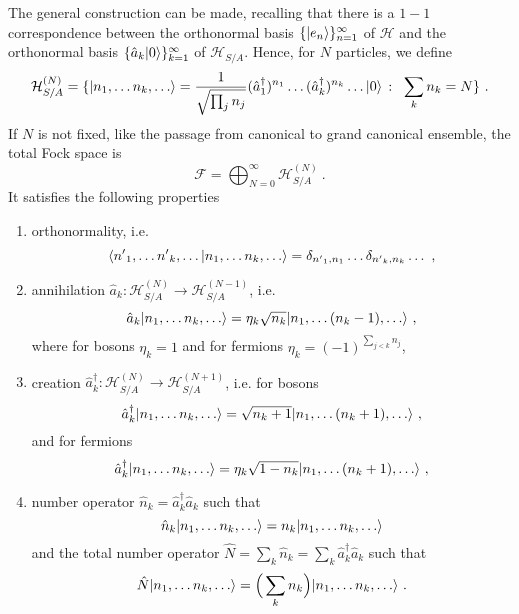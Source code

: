     The general construction can be made, recalling that there is a $1-1$ correspondence between the orthonormal basis $\{\vert e_n\rangle\}_{n=1}^\infty$ of $\mathcal H$ and the orthonormal basis $\{\hat a_k \vert0\rangle\}_{k=1}^\infty$ of $\mathcal H_{S/A}$. Hence, for $N$ particles, we define
    \begin{equation*}
        \mathcal H_{S/A}^{(N)} = \{\vert n_1, \ldots n_k, \ldots\rangle = \frac{1}{\sqrt{ \prod_j n_j}} (\hat a_1^\dagger)^{n_1} \ldots (\hat a_k^\dagger)^{n_k} \ldots \vert0\rangle ~\colon~ \sum_k n_k = N\} ~.
    \end{equation*} 
    If $N$ is not fixed, like the passage from canonical to grand canonical ensemble, the total Fock space is 
    \begin{equation*}
        \mathcal F = \bigoplus_{N=0}^\infty \mathcal H^{(N)}_{S/A} ~.
    \end{equation*} 
    It satisfies the following properties 
    \begin{enumerate}
        \item orthonormality, i.e. 
            \begin{equation*}
                \langle{n'}_1, \ldots {n'}_k, \ldots\vert n_1, \ldots n_k, \ldots\rangle = \delta_{{n'}_1, n_1} \ldots \delta_{{n'}_k, n_k} \ldots  ~,
            \end{equation*}
        \item annihilation $\hat a_k \colon \mathcal H^{(N)}_{S/A} \rightarrow \mathcal H^{(N-1)}_{S/A}$, i.e.
            \begin{equation*}
                \hat a_k \vert n_1, \ldots n_k, \ldots\rangle = \eta_k \sqrt{n_k} \vert n_1, \ldots (n_k - 1), \ldots\rangle ~,
            \end{equation*}
            where for bosons $\eta_k = 1$ and for fermions $\eta_k = (-1)^{\sum_{j < k} n_j}$,
        \item creation $\hat a_k^\dagger \colon \mathcal H^{(N)}_{S/A} \rightarrow \mathcal H^{(N+1)}_{S/A}$, i.e. for bosons
            \begin{equation*}
                \hat a^\dagger_k \vert n_1, \ldots n_k, \ldots\rangle = \sqrt{n_k + 1} \vert n_1, \ldots (n_k + 1), \ldots\rangle ~,
            \end{equation*}
            and for fermions
            \begin{equation*}
                \hat a^\dagger_k \vert n_1, \ldots n_k, \ldots\rangle = \eta_k \sqrt{1 - n_k} \vert n_1, \ldots (n_k + 1), \ldots\rangle ~,
            \end{equation*}
        \item number operator $\hat n_k = \hat a_k^\dagger \hat a_k$ such that 
            \begin{equation*}
                \hat n_k \vert n_1, \ldots n_k, \ldots\rangle = n_k \vert n_1, \ldots n_k, \ldots\rangle
            \end{equation*}
        and the total number operator $\hat N = \sum_k \hat n_k = \sum_k \hat a^\dagger_k \hat a_k$ such that 
        \begin{equation*}
            \hat N \vert n_1, \ldots n_k, \ldots\rangle = \Big (\sum_k n_k \Big ) \vert n_1, \ldots n_k, \ldots\rangle ~.
        \end{equation*}
    \end{enumerate}

